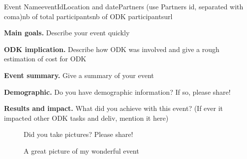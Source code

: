 \begin{event}{Event Name}{eventId}{Location and date}{Partners (use Partners id, separated with coma)}{nb of total participants}{nb of ODK participants}{url}

\textbf{Main goals.} Describe your event quickly

\textbf{ODK implication.} Describe how ODK was involved and give a rough estimation of cost for ODK

\textbf{Event summary.} Give a summary of your event

\textbf{Demographic.} Do you have demographic information? If so, please share!

\textbf{Results and impact.} What did you achieve with this event? (If ever it impacted 
other ODK tasks and deliv, mention it here)

\begin{figure}[ht]
\caption*{A great picture of my wonderful event}
Did you take pictures? Please share!
\end{figure}



\end{event}